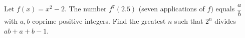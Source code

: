 Let $f(x)=x^2-2$. The number $f^{7}(2.5)$ (seven applications of $f$) equals $\dfrac ab$ with $a,b$ coprime positive integers. Find the greatest $n$ such that $2^n$ divides $ab+a+b-1$.
